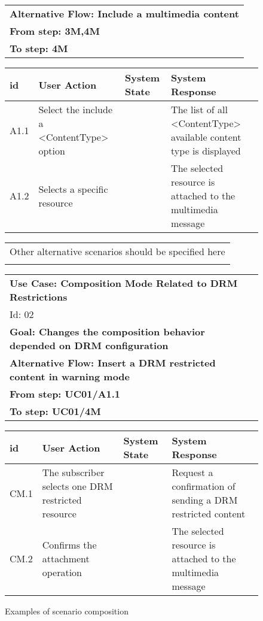 \documentclass{acm_proc_article-sp}
\begin{document}
\begin{figure}[hb]
\begin{center}
\begin{tiny}
{\begin{tabular}{l}
  \\
 {\bf Alternative Flow:  Include a multimedia content} \\ 
 {\bf From step: 3M,4M} \\
  {\bf To step: 4M} \\
 \end{tabular}
   \begin{tabular}{|p{0.2in}|p{1in}|p{0.8in}|p{1in}|}
  \hline  
   id & User Action & System State & System Response \\ \hline 
  A1.1  & Select the include a <ContentType> option & &The list of all <ContentType> available content type is displayed \\ \hline
  A1.2 & Selects a specific resource & &  The selected resource is attached to the multimedia message   \\ \hline
  \end{tabular} 
  \begin{tabular}{l} 
     \\
    Other alternative scenarios should be specified here \\ \\
  \end{tabular}
  \begin{tabular}{l}
  {\bf Use Case: Composition Mode Related to DRM Restrictions}  \\ Id: 02 \\ 
  {\bf Goal: Changes the composition behavior depended on DRM configuration}   \\
  {\bf Alternative Flow:  Insert a DRM restricted content in warning mode} \\ 
  {\bf From step: UC01/A1.1 }\\
  {\bf To step: UC01/4M} \\
  \end{tabular}
   \begin{tabular}{|p{0.2in}|p{1in}|p{0.8in}|p{1in}|}
  \hline  
   id & User Action & System State & System Response \\ \hline 
  CM.1  & The subscriber selects one DRM restricted resource & & Request a confirmation of sending a DRM restricted content \\ \hline
  CM.2 & Confirms the attachment operation & &  The selected resource is attached to the multimedia message   \\ \hline
  \end{tabular} 
 } 
\end{tiny}
\end{center}
\caption{Examples of scenario composition}
\label{fig:cc-01}
\end{figure}
\end{document}
